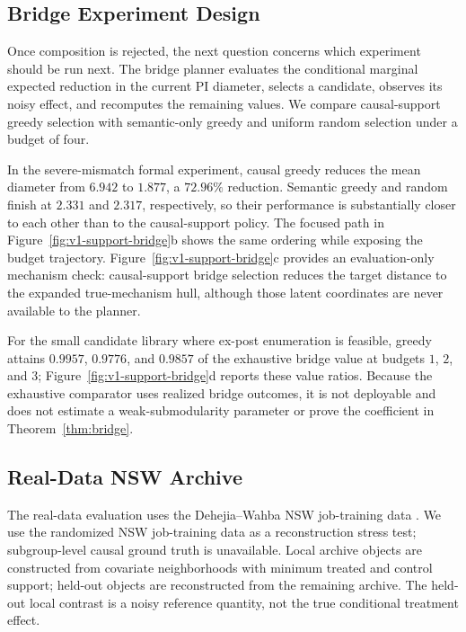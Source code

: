 \documentclass[11pt]{article}
\numberwithin{equation}{section}
\newcommand{\1}{\mathbf 1}
\begin{document}
\subsection{Bridge Experiment Design}
Once composition is rejected, the next question concerns which experiment should be run next.  The bridge planner evaluates the conditional marginal expected reduction in the current PI diameter, selects a candidate, observes its noisy effect, and recomputes the remaining values.  We compare causal-support greedy selection with semantic-only greedy and uniform random selection under a budget of four.

In the severe-mismatch formal experiment, causal greedy reduces the mean diameter from $6.942$ to $1.877$, a $72.96\%$ reduction.  Semantic greedy and random finish at $2.331$ and $2.317$, respectively, so their performance is substantially closer to each other than to the causal-support policy.  The focused path in Figure~\ref{fig:v1-support-bridge}b shows the same ordering while exposing the budget trajectory.  Figure~\ref{fig:v1-support-bridge}c provides an evaluation-only mechanism check: causal-support bridge selection reduces the target distance to the expanded true-mechanism hull, although those latent coordinates are never available to the planner.

For the small candidate library where ex-post enumeration is feasible, greedy attains $0.9957$, $0.9776$, and $0.9857$ of the exhaustive bridge value at budgets $1$, $2$, and $3$; Figure~\ref{fig:v1-support-bridge}d reports these value ratios.  Because the exhaustive comparator uses realized bridge outcomes, it is not deployable and does not estimate a weak-submodularity parameter or prove the coefficient in Theorem~\ref{thm:bridge}.
\subsection{Real-Data NSW Archive}

The real-data evaluation uses the Dehejia--Wahba NSW job-training data \citep{lalonde1986evaluating,dehejia1999causal}.  We use the randomized NSW job-training data as a reconstruction stress test; subgroup-level causal ground truth is unavailable.  Local archive objects are constructed from covariate neighborhoods with minimum treated and control support; held-out objects are reconstructed from the remaining archive.  The held-out local contrast is a noisy reference quantity, not the true conditional treatment effect.


\end{document}
